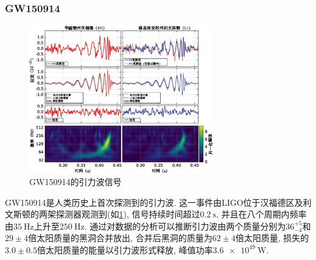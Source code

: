 \documentclass[hidelinks]{ctexart}
\begin{document}
\subsubsection{GW150914} %
\label{ssub:gw150914}

\begin{figure}[ht]
    \centering
    \includegraphics[width=8cm]{src/LIGO_measurement_of_gravitational_waves(zh-hans).png}
    \caption{GW150914的引力波信号\cite{PhysRevLett.116.061102}}
    \label{fig:GW150914的引力波信号}
\end{figure}

GW150914是人类历史上首次探测到的引力波. 这一事件由LIGO位于汉福德区及利文斯顿的两架探测器观测到(如\cref{fig:GW150914的引力波信号}), 信号持续时间超过$\SI{0.2}{\second}$, 并且在八个周期内频率由$\SI{35}{\hertz}$上升至$\SI{250}{\hertz}$. 通过对数据的分析可以推断引力波由两个质量分别为$36_{-4}^{+5}$和$29\pm 4$倍太阳质量的黑洞合并放出, 合并后黑洞的质量为$62\pm 4$倍太阳质量, 损失的$3.0 \pm 0.5$倍太阳质量的能量以引力波形式释放, 峰值功率$\SI{3.6e49}{\watt}$.






\end{document}
